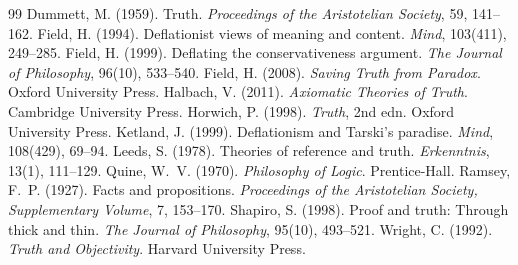 \documentclass{situationist-preprint}
\begin{document}
\begin{thebibliography}{99}\small
{} Dummett, M. (1959). Truth. \emph{Proceedings of the Aristotelian Society}, 59, 141--162.
 Field, H. (1994). Deflationist views of meaning and content. \emph{Mind}, 103(411), 249--285.
 Field, H. (1999). Deflating the conservativeness argument. \emph{The Journal of Philosophy}, 96(10), 533--540.
 Field, H. (2008). \emph{Saving Truth from Paradox}. Oxford University Press.
 Halbach, V. (2011). \emph{Axiomatic Theories of Truth}. Cambridge University Press.
 Horwich, P. (1998). \emph{Truth}, 2nd edn. Oxford University Press.
 Ketland, J. (1999). Deflationism and Tarski's paradise. \emph{Mind}, 108(429), 69--94.
 Leeds, S. (1978). Theories of reference and truth. \emph{Erkenntnis}, 13(1), 111--129.
 Quine, W.~V. (1970). \emph{Philosophy of Logic}. Prentice-Hall.
 Ramsey, F.~P. (1927). Facts and propositions. \emph{Proceedings of the Aristotelian Society, Supplementary Volume}, 7, 153--170.
 Shapiro, S. (1998). Proof and truth: Through thick and thin. \emph{The Journal of Philosophy}, 95(10), 493--521.
 Wright, C. (1992). \emph{Truth and Objectivity}. Harvard University Press.
\end{thebibliography}
\end{document}

